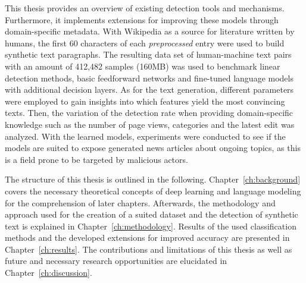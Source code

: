 This thesis provides an overview of existing detection tools and mechanisms. Furthermore, it implements extensions for improving these models through domain-specific metadata. With Wikipedia as a source for literature written by humans, the first 60 characters of each \textit{preprocessed} entry were used to build synthetic text paragraphs. The resulting data set of human-machine text pairs with an amount of 412,482 samples (160MB) was used to benchmark linear detection methods, basic feedforward networks and fine-tuned language models with additional decision layers. As for the text generation, different parameters were employed to gain insights into which features yield the most convincing texts. Then, the variation of the detection rate when providing domain-specific knowledge such as the number of page views, categories and the latest edit was analyzed. With the learned models, experiments were conducted to see if the models are suited to expose generated news articles about ongoing topics, as this is a field prone to be targeted by malicious actors.

The structure of this thesis is outlined in the following. Chapter~\ref{ch:background} covers the necessary theoretical concepts of deep learning and language modeling for the comprehension of later chapters. Afterwards, the methodology and approach used for the creation of a suited dataset and the detection of synthetic text is explained in Chapter~\ref{ch:methodology}. Results of the used classification methods and the developed extensions for improved accuracy are presented in Chapter~\ref{ch:results}. The contributions and limitations of this thesis as well as future and necessary research opportunities are elucidated in Chapter~\ref{ch:discussion}.
